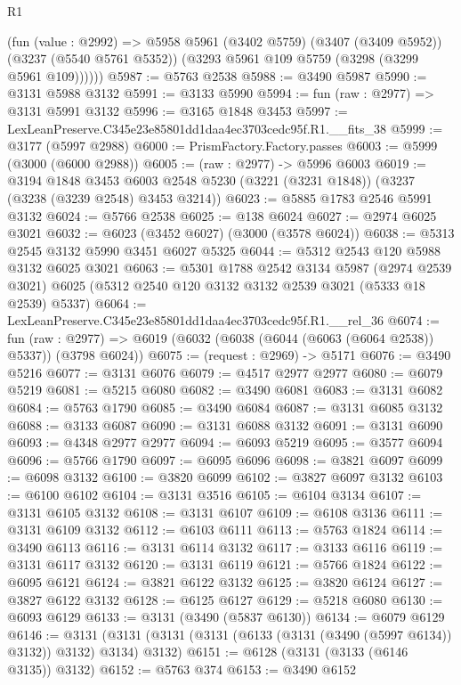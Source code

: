 \begin{lexlean}{R1}
\begin{coremodule}
        (fun (value : @2992) =>
        @5958
          @5961
          (@3402 @5759)
          (@3407 (@3409 @5952))
          (@3237 (@5540 @5761 @5352))
          (@3293 @5961 @109 @5759 (@3298 (@3299 @5961 @109))))))
@5987 := @5763 @2538
@5988 := @3490 @5987
@5990 := @3131 @5988 @3132
@5991 := @3133 @5990
@5994 := fun (raw : @2977) => @3131 @5991 @3132
@5996 := @3165 @1848 @3453
@5997 := LexLeanPreserve.C345e23e85801dd1daa4ec3703cedc95f.R1.__fits_38
@5999 := @3177 (@5997 @2988)
@6000 := PrismFactory.Factory.passes
@6003 := @5999 (@3000 (@6000 @2988))
@6005 := (raw : @2977) -> @5996 @6003
@6019 := @3194
    @1848
    @3453
    @6003
    @2548
    @5230
    (@3221 (@3231 @1848))
    (@3237 (@3238 (@3239 @2548) @3453 @3214))
@6023 := @5885 @1783 @2546 @5991 @3132
@6024 := @5766 @2538
@6025 := @138 @6024
@6027 := @2974 @6025 @3021
@6032 := @6023 (@3452 @6027) (@3000 (@3578 @6024))
@6038 := @5313 @2545 @3132 @5990 @3451 @6027 @5325
@6044 := @5312 @2543 @120 @5988 @3132 @6025 @3021
@6063 := @5301
    @1788
    @2542
    @3134
    @5987
    (@2974 @2539 @3021)
    @6025
    (@5312 @2540 @120 @3132 @3132 @2539 @3021 (@5333 @18 @2539) @5337)
@6064 := LexLeanPreserve.C345e23e85801dd1daa4ec3703cedc95f.R1.__rel_36
@6074 := fun (raw : @2977) =>
  @6019 (@6032 (@6038 (@6044 (@6063 (@6064 @2538)) @5337)) (@3798 @6024))
@6075 := (request : @2969) -> @5171
@6076 := @3490 @5216
@6077 := @3131 @6076
@6079 := @4517 @2977 @2977
@6080 := @6079 @5219
@6081 := @5215 @6080
@6082 := @3490 @6081
@6083 := @3131 @6082
@6084 := @5763 @1790
@6085 := @3490 @6084
@6087 := @3131 @6085 @3132
@6088 := @3133 @6087
@6090 := @3131 @6088 @3132
@6091 := @3131 @6090
@6093 := @4348 @2977 @2977
@6094 := @6093 @5219
@6095 := @3577 @6094
@6096 := @5766 @1790
@6097 := @6095 @6096
@6098 := @3821 @6097
@6099 := @6098 @3132
@6100 := @3820 @6099
@6102 := @3827 @6097 @3132
@6103 := @6100 @6102
@6104 := @3131 @3516
@6105 := @6104 @3134
@6107 := @3131 @6105 @3132
@6108 := @3131 @6107
@6109 := @6108 @3136
@6111 := @3131 @6109 @3132
@6112 := @6103 @6111
@6113 := @5763 @1824
@6114 := @3490 @6113
@6116 := @3131 @6114 @3132
@6117 := @3133 @6116
@6119 := @3131 @6117 @3132
@6120 := @3131 @6119
@6121 := @5766 @1824
@6122 := @6095 @6121
@6124 := @3821 @6122 @3132
@6125 := @3820 @6124
@6127 := @3827 @6122 @3132
@6128 := @6125 @6127
@6129 := @5218 @6080
@6130 := @6093 @6129
@6133 := @3131 (@3490 (@5837 @6130))
@6134 := @6079 @6129
@6146 := @3131 (@3131 (@3131 (@3131 (@6133 (@3131 (@3490 (@5997 @6134)) @3132)) @3132) @3134) @3132)
@6151 := @6128 (@3131 (@3133 (@6146 @3135)) @3132)
@6152 := @5763 @374
@6153 := @3490 @6152

\end{coremodule}
\end{lexlean}
